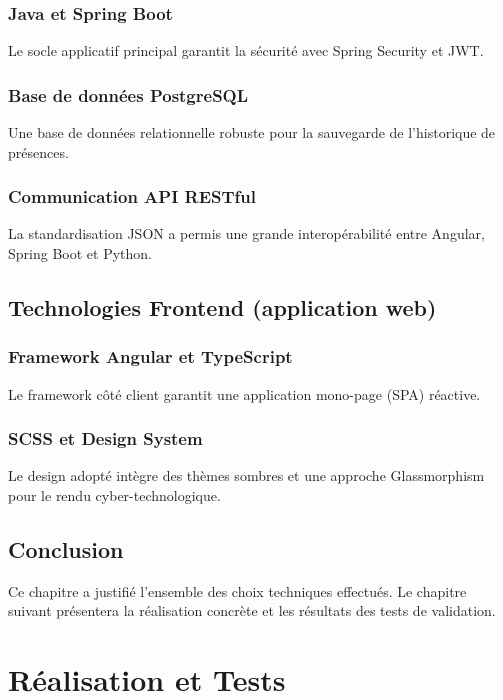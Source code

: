 \documentclass[12pt,a4paper]{report}
\begin{document}
\subsection{Java et Spring Boot}
Le socle applicatif principal garantit la sécurité avec Spring Security et JWT.

\subsection{Base de données PostgreSQL}
Une base de données relationnelle robuste pour la sauvegarde de l'historique de présences.

\subsection{Communication API RESTful}
La standardisation JSON a permis une grande interopérabilité entre Angular, Spring Boot et Python.

\section{Technologies Frontend (application web)}

\subsection{Framework Angular et TypeScript}
Le framework côté client garantit une application mono-page (SPA) réactive.

\subsection{SCSS et Design System}
Le design adopté intègre des thèmes sombres et une approche Glassmorphism pour le rendu cyber-technologique.

\section{Conclusion}
Ce chapitre a justifié l'ensemble des choix techniques effectués. Le chapitre suivant présentera la
réalisation concrète et les résultats des tests de validation.

\chapter{Réalisation et Tests}
\end{document}

